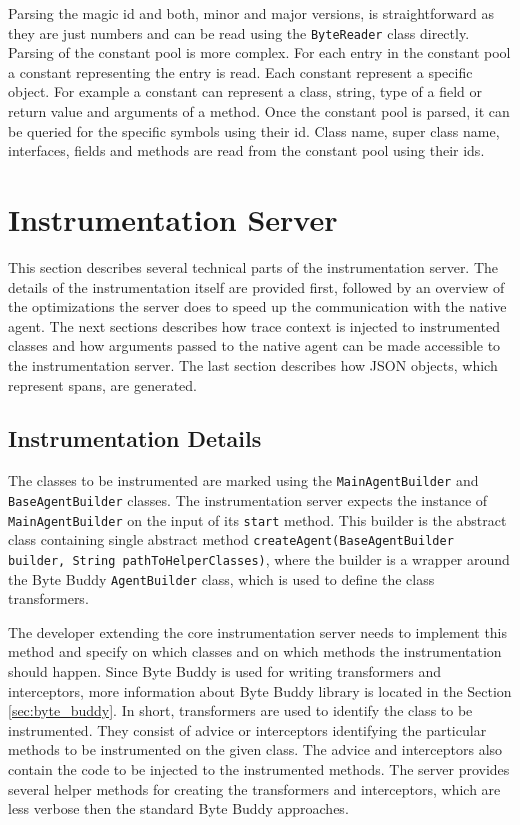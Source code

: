 Parsing the magic id and both, minor and major versions, is straightforward as they are just numbers and can be read using the \texttt{ByteReader} class directly. Parsing of the constant pool is more complex. For each entry in the constant pool a constant representing the entry is read. Each constant represent a specific object. For example a constant can represent a class, string, type of a field or return value and arguments of a method. Once the constant pool is parsed, it can be queried for the specific symbols using their id. Class name, super class name, interfaces, fields and methods are read from the constant pool using their ids.

\section{Instrumentation Server}
This section describes several technical parts of the instrumentation server. The details of the instrumentation itself are provided first, followed by an overview of the optimizations the server does to speed up the communication with the native agent. The next sections describes how trace context is injected to instrumented classes and how arguments passed to the native agent can be made accessible to the instrumentation server. The last section describes how JSON objects, which represent spans, are generated.

\subsection{Instrumentation Details}
\label{impl:server:instr}
The classes to be instrumented are marked using the \texttt{MainAgentBuilder} and \texttt{BaseAgentBuilder} classes.
The instrumentation server expects the instance of \texttt{MainAgentBuilder} on the input of its \texttt{start} method. This builder is the abstract class containing single abstract method \texttt{createAgent(BaseAgentBuilder builder, String pathToHelperClasses)}, where the builder is a wrapper \linebreak around the Byte Buddy \texttt{AgentBuilder} class, which is used to define the class transformers.

The developer extending the core instrumentation server needs to implement this method and specify on which classes and on which methods the instrumentation should happen. Since Byte Buddy is used for writing transformers and interceptors, more information about Byte Buddy library is located in the Section \ref{sec:byte_buddy}. In short, transformers are used to identify the class to be instrumented. They consist of advice or interceptors identifying the particular methods to be instrumented on the given class. The advice and interceptors also contain the code to be injected to the instrumented methods. The server provides several helper methods for creating the transformers and interceptors, which are less verbose then the standard Byte Buddy approaches.


